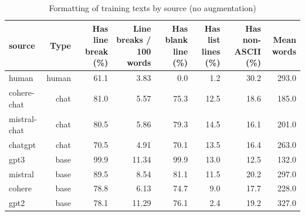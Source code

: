 \begin{table}[!t]
\centering
\caption{Formatting of training texts by source (no augmentation)}
\label{tab:formatting_by_source}
\footnotesize
\begin{tabular}{lrrrrrrr}
\toprule
\textbf{source} & \textbf{Type} & \textbf{Has line break (\%)} & \textbf{Line breaks / 100 words} & \textbf{Has blank line (\%)} & \textbf{Has list lines (\%)} & \textbf{Has non-ASCII (\%)} & \textbf{Mean words} \\
\midrule
human & human & 61.1 & 3.83 & 0.0 & 1.2 & 30.2 & 293.0 \\
cohere-chat & chat & 81.0 & 5.57 & 75.3 & 12.5 & 18.6 & 185.0 \\
mistral-chat & chat & 80.5 & 5.86 & 79.3 & 14.5 & 16.1 & 201.0 \\
chatgpt & chat & 70.5 & 4.91 & 70.1 & 13.5 & 16.4 & 263.0 \\
gpt3 & base & 99.9 & 11.34 & 99.9 & 13.0 & 12.5 & 132.0 \\
mistral & base & 89.5 & 8.54 & 81.1 & 11.5 & 20.2 & 297.0 \\
cohere & base & 78.8 & 6.13 & 74.7 & 9.0 & 17.7 & 228.0 \\
gpt2 & base & 78.1 & 11.29 & 76.1 & 2.4 & 19.2 & 327.0 \\
\bottomrule
\end{tabular}
\end{table}

